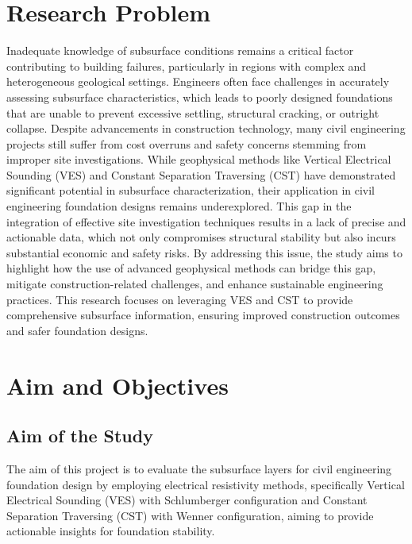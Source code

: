 \documentclass[12pt,a4paper]{report}
\begin{document}
\section{Research Problem}
Inadequate knowledge of subsurface conditions remains a critical factor contributing to building failures, particularly in regions with complex and heterogeneous geological settings. Engineers often face challenges in accurately assessing subsurface characteristics, which leads to poorly designed foundations that are unable to prevent excessive settling, structural cracking, or outright collapse. Despite advancements in construction technology, many civil engineering projects still suffer from cost overruns and safety concerns stemming from improper site investigations.
While geophysical methods like Vertical Electrical Sounding (VES) and Constant Separation Traversing (CST) have demonstrated significant potential in subsurface characterization, their application in civil engineering foundation designs remains underexplored. This gap in the integration of effective site investigation techniques results in a lack of precise and actionable data, which not only compromises structural stability but also incurs substantial economic and safety risks. By addressing this issue, the study aims to highlight how the use of advanced geophysical methods can bridge this gap, mitigate construction-related challenges, and enhance sustainable engineering practices. This research focuses on leveraging VES and CST to provide comprehensive subsurface information, ensuring improved construction outcomes and safer foundation designs.

\section{Aim and Objectives}
\subsection{Aim of the Study}
The aim of this project is to evaluate the subsurface layers for civil engineering foundation design by employing electrical resistivity methods, specifically Vertical Electrical Sounding (VES) with Schlumberger configuration and Constant Separation Traversing (CST) with Wenner configuration, aiming to provide actionable insights for foundation stability.
\end{document}
